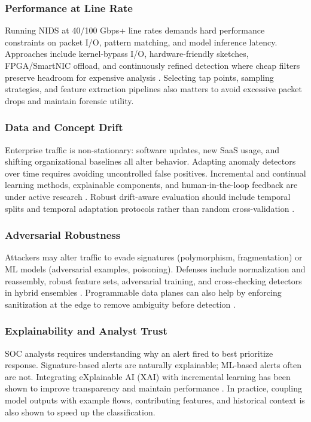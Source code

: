 \subsubsection{Performance at Line Rate} 
Running NIDS at 40/100 Gbps+ line rates demands hard performance constraints on packet I/O, pattern matching, and model inference latency. Approaches include kernel-bypass I/O, hardware-friendly sketches, FPGA/SmartNIC offload, and continuously refined detection where cheap filters preserve headroom for expensive analysis \parencite{Han2023HPNIDS,NSDI2023Electrode,ASPLOS2023eHDL,P4NIDS2024}. Selecting tap points, sampling strategies, and feature extraction pipelines also matters to avoid excessive packet drops and maintain forensic utility.

\subsubsection{Data and Concept Drift} 
Enterprise traffic is non-stationary: software updates, new SaaS usage, and shifting organizational baselines all alter behavior. Adapting anomaly detectors over time requires avoiding uncontrolled false positives. Incremental and continual learning methods, explainable components, and human-in-the-loop feedback are under active research \parencite{Cerasuolo2025Adaptable,ACM2024DLIDSReview}. Robust drift-aware evaluation should include temporal splits and temporal adaptation protocols rather than random cross-validation \parencite{KBS2025Datasets}.

\subsubsection{Adversarial Robustness} 
Attackers may alter traffic to evade signatures (polymorphism, fragmentation) or ML models (adversarial examples, poisoning). Defenses include normalization and reassembly, robust feature sets, adversarial training, and cross-checking detectors in hybrid ensembles \parencite{Maseno2022HybridReview,Naghib2025HybridReview}. Programmable data planes can also help by enforcing sanitization at the edge to remove ambiguity before detection \parencite{P4NIDS2024}.

\subsubsection{Explainability and Analyst Trust} 
SOC analysts requires understanding why an alert fired to best prioritize response. Signature-based alerts are naturally explainable; ML-based alerts often are not. Integrating eXplainable AI (XAI) with incremental learning has been shown to improve transparency and maintain performance \parencite{Cerasuolo2025Adaptable}. In practice, coupling model outputs with example flows, contributing features, and historical context is also shown to speed up the classification.

